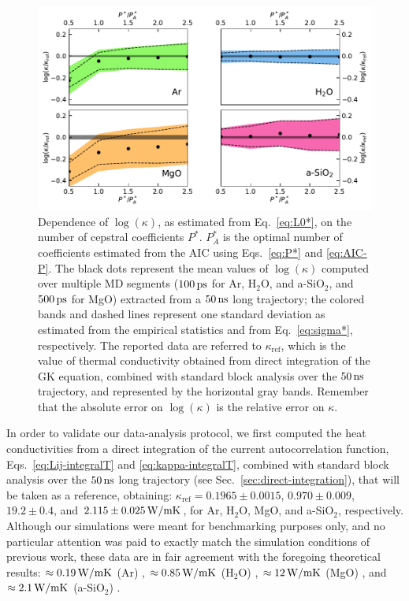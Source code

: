 \begin{figure}[!tb]
    \centering
    \includegraphics[width=\textwidth]{chapters/chapter5/figures/L-vs-P.pdf}
    \caption{Dependence of $\log(\kappa)$, as estimated from Eq.~\eqref{eq:L0*}, on the number of cepstral coefficients $P^*$. $P_A^*$ is the optimal number of coefficients estimated from the AIC using Eqs.~\eqref{eq:P*} and \eqref{eq:AIC-P}. The black dots represent the mean values of $\log(\kappa)$ computed over multiple MD segments ($100\,\mathrm{ps}$ for Ar, H$_2$O, and a-SiO$_2$, and $500\,\mathrm{ps}$ for MgO) extracted from a $50\,\mathrm{ns}$ long trajectory; the colored bands and dashed lines represent one standard deviation as estimated from the empirical statistics and from Eq.~\eqref{eq:sigma*}, respectively. The reported data are referred to $\kappa_{\mathrm{ref}}$, which is the value of thermal conductivity obtained from direct integration of the GK equation, combined with standard block analysis over the $50\,\mathrm{ns}$ trajectory, and represented by the horizontal gray bands. Remember that the absolute error on $\log(\kappa)$ is the relative error on $\kappa$.}
    \label{fig:L-vs-P}
\end{figure}

In order to validate our data-analysis protocol, we first computed the heat conductivities from a direct integration of the current autocorrelation function, Eqs.~\eqref{eq:Lij-integralT} and \eqref{eq:kappa-integralT}, combined with standard block analysis over the $50\,\mathrm{ns}$ long trajectory (see Sec.~\ref{sec:direct-integration}), that will be taken as a reference, obtaining: $\kappa_{\mathrm{ref}} = 0.1965 \pm 0.0015$, $0.970 \pm 0.009$, $19.2 \pm 0.4$, and $2.115 \pm 0.025 \,\mathrm{W/mK}$, for Ar, H$_2$O, MgO, and a-SiO$_2$, respectively. 
Although our simulations were meant for benchmarking purposes only, and no particular attention was paid to exactly match the simulation conditions of previous work, these data are in fair agreement with the foregoing theoretical results: $\approx 0.19\,\mathrm{W/mK}$ (Ar) \cite{Argon-FF}, $\approx 0.85\,\mathrm{W/mK}$ (H$_2$O) \cite{Romer2012}, $\approx 12\,\mathrm{W/mK}$ (MgO) \cite{MgO-FF}, and $\approx 2.1\,\mathrm{W/mK}$ (a-SiO$_2$) \cite{Larkin2014}.


